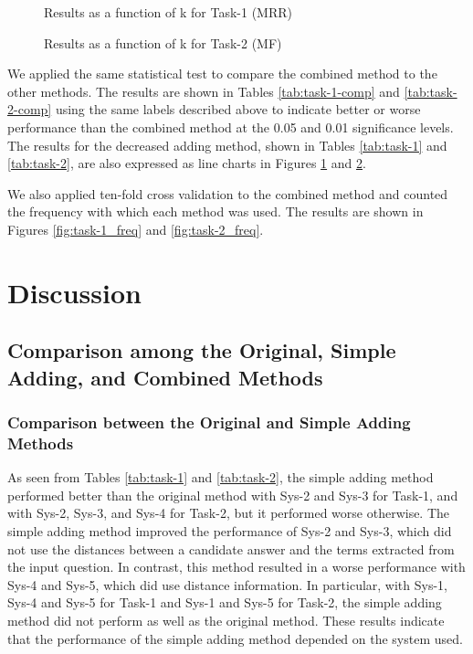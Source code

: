 \begin{figure}[p]
      \begin{center}
      \end{center}
      \caption{Results as a function of k for Task-1 (MRR)}
    \label{fig:task-1_results}
\end{figure}

\begin{figure}[p]
      \begin{center}
      \end{center}
      \caption{Results as a function of k for Task-2 (MF)}
      \label{fig:task-2_results}
\end{figure}


We applied the same statistical test to compare the combined method to the other methods. 
The results are shown in Tables \ref{tab:task-1-comp} and \ref{tab:task-2-comp}
using the same labels described above to indicate better or worse performance than the combined method at 
the 0.05 and 0.01 significance levels.
The results for the decreased adding method, shown in Tables \ref{tab:task-1} and \ref{tab:task-2}, are also expressed 
as line charts in Figures \ref{fig:task-1_results} and \ref{fig:task-2_results}. 

We also applied ten-fold cross validation to the combined method
and counted the frequency with which each method was used. 
The results are shown in Figures \ref{fig:task-1_freq} and \ref{fig:task-2_freq}. 

\section{Discussion}
\label{sec:discussions}


\subsection{Comparison among the Original, Simple Adding, and Combined Methods}

\subsubsection{Comparison between the Original and Simple Adding Methods}

As seen from Tables \ref{tab:task-1} and \ref{tab:task-2}, 
the simple adding method performed better than the original method 
with Sys-2 and Sys-3 for Task-1, and 
with Sys-2, Sys-3, and Sys-4 for Task-2, but 
it performed worse otherwise. 
The simple adding method improved the performance
of Sys-2 and Sys-3, which did not use the distances between 
a candidate answer and the terms extracted from the input question. 
In contrast, 
this method resulted in a worse performance 
with Sys-4 and Sys-5, which did use distance information. 
In particular, 
with Sys-1, Sys-4 and Sys-5 for Task-1 and 
Sys-1 and Sys-5 for Task-2, 
the simple adding method did not perform as well as
the original method. 
These results indicate that 
the performance of the simple adding method
depended on the system used.

